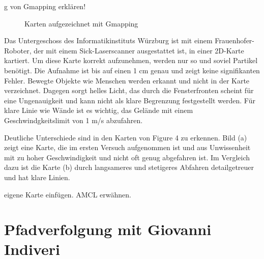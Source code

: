 \documentclass[11pt,a4paper]{article}
\begin{document}
{g von Gmapping erklären!

\begin{figure}[h]
	\centering
	\caption{Karten aufgezeichnet mit Gmapping}
\end{figure}


Das Untergeschoss des Informatikinstituts W\"urzburg ist mit einem Frauenhofer-Roboter, der mit einem Sick-Laserscanner ausgestattet ist, in einer 2D-Karte kartiert.  Um diese Karte korrekt aufzunehmen, werden nur so und soviel Partikel ben\"otigt. Die Aufnahme ist bis auf einen 1 cm genau und zeigt keine signifikanten Fehler. Bewegte Objekte wie Menschen werden erkannt und nicht in der Karte verzeichnet. Dagegen sorgt helles Licht, das durch die Fensterfronten scheint f\"ur eine Ungenauigkeit und kann nicht als klare Begrenzung festgestellt werden. F\"ur klare Linie wie W\"ande ist es wichtig, das Gel\"ande mit einem Geschwindgkeitslimit von 1 m/s abzufahren. 



Deutliche Unterschiede sind in den Karten von Figure 4 zu erkennen. Bild (a) zeigt eine Karte, die im ersten Versuch aufgenommen ist und aus Unwissenheit mit zu hoher Geschwindigkeit und nicht oft genug abgefahren ist. Im Vergleich dazu ist die Karte (b) durch langsameres und stetigeres Abfahren detailgetreuer und hat klare Linien.


eigene Karte einfügen. AMCL erwähnen.


\section{Pfadverfolgung mit Giovanni Indiveri}
\cite{Giovanni}


}
\end{document}

